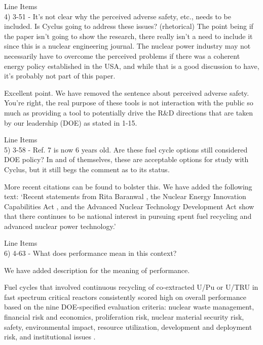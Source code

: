 \documentclass[answers,11pt]{exam}
\begin{document}
\begin{questions}
\question Line Items \\
4) 3-51 - It’s not clear why the perceived adverse safety, etc., needs to be included. Is Cyclus going
to address these issues? (rhetorical) The point being if the paper isn’t going to show the research,
there really isn’t a need to include it since this is a nuclear engineering journal. The nuclear power
industry may not necessarily have to overcome the perceived problems if there was a coherent energy
policy established in the USA, and while that is a good discussion to have, it’s probably not part of
this paper.

\begin{solution}
Excellent point. We have removed the sentence about perceived adverse safety. You're right, the real purpose 
of these tools is not interaction with the public so much as providing a tool to potentially drive the 
R\&D directions that are taken by our leadership (DOE) as stated in 1-15. 
\end{solution}

\question Line Items \\
5) 3-58 - Ref. 7 is now 6 years old. Are these fuel cycle options still considered DOE policy? In and of
themselves, these are acceptable options for study with Cyclus, but it still begs the comment as to its
status.

\begin{solution}
More recent citations can be found to bolster this. We have added the following text: 
`Recent statements from Rita Baranwal \cite{noauthor_new_2019}, the Nuclear Energy Innovation 
Capabilities Act \cite{crapo_s97_2018}, and the Advanced Nuclear Technology Development Act \cite{latta_hr590_2017} 
show that there continues to be national interest in pursuing spent fuel recycling and advanced nuclear power 
technology.'
\end{solution}

\question Line Items \\
6) 4-63 - What does performance mean in this context?

\begin{solution}
We have added description for the meaning of performance. 

Fuel cycles that involved continuous recycling
of co-extracted U/Pu or U/TRU in fast spectrum critical reactors
consistently scored high on overall performance based on the nine 
DOE-specified evaluation criteria: nuclear waste management, 
financial risk and economics, 
proliferation risk, nuclear material security risk, safety, 
environmental impact, resource utilization, development and deployment 
risk, and institutional issues \cite{wigeland_nuclear_2014}. 
\end{solution}


\end{questions}
\end{document}
